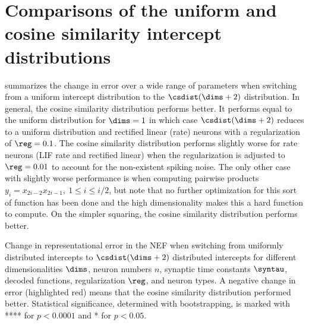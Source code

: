 \chapter{Comparisons of the uniform and cosine similarity intercept distributions}\label{apdx:hdrep}
 summarizes the change in error over a wide range of parameters when switching from a uniform intercept distribution to the $\csdist(\dims + 2)$ distribution.
In general, the cosine similarity distribution performs better.
It performs equal to the uniform distribution for $\dims = 1$ in which case $\csdist(\dims + 2)$ reduces to a uniform distribution and rectified linear (rate) neurons with a regularization of $\reg = 0.1$.
The cosine similarity distribution performs slightly worse for rate neurons (LIF rate and rectified linear) when the regularization is adjusted to $\reg = 0.01$ to account for the non-existent spiking noise.
The only other case with slightly worse performance is when computing pairwise products $y_i = x_{2i - 2} x_{2i - 1},\ 1 \leq i \leq i/2$, but note that no further optimization for this sort of function has been done and the high dimensionality makes this a hard function to compute.
On the simpler squaring, the cosine similarity distribution performs better.
\begin{table}
    \begin{addmargin*}[0mm]{-26pt}
        \caption[Comparison of uniformly and $\csdist(\dims + 2)$ distributed intercepts.]{Change in representational error in the NEF when switching from uniformly distributed intercepts to $\csdist(\dims + 2)$ distributed intercepts for different dimensionalities $\dims$, neuron numbers $n$, synaptic time constants $\syntau$, decoded functions, regularization $\reg$, and neuron types.
    A negative change in error (highlighted red) means that the cosine similarity distribution performed better.
    Statistical significance, determined with bootstrapping, is marked with **** for $p < 0.0001$ and * for $p < 0.05$.}\label{tbl:csdist}
        \scriptsize\centering
        
    \end{addmargin*}
\end{table}

